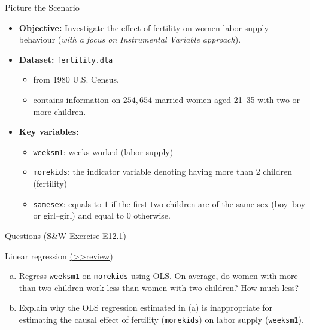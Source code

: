 \documentclass[
  10pt,
  ignorenonframetext,
]{beamer}
\providecommand{\tightlist}{%
  \setlength{\itemsep}{0pt}\setlength{\parskip}{0pt}}
\begin{document}
\begin{frame}[fragile]{Picture the Scenario}
\protect\hypertarget{picture-the-scenario}{}
\begin{itemize}
\tightlist
\item
  \textbf{Objective:} Investigate the effect of fertility on women labor
  supply behaviour (\emph{with a focus on Instrumental Variable
  approach}).
\end{itemize}

\vspace{0.8mm}

\begin{itemize}
\tightlist
\item
  \textbf{Dataset:} \texttt{fertility.dta}

  \begin{itemize}
  \tightlist
  \item
    from 1980 U.S. Census.
  \item
    contains information on \(254,654\) married women aged 21--35 with
    two or more children.
  \end{itemize}
\end{itemize}

\vspace{0.8mm}

\begin{itemize}
\tightlist
\item
  \textbf{Key variables:}

  \begin{itemize}
  \tightlist
  \item
    \texttt{weeksm1}: weeks worked (labor supply)
  \item
    \texttt{morekids}: the indicator variable denoting having more than
    2 children (fertility)
  \item
    \texttt{samesex}: equals to \(1\) if the first two children are of
    the same sex (boy--boy or girl--girl) and equal to \(0\) otherwise.
  \end{itemize}
\end{itemize}
\end{frame}

\begin{frame}[fragile]{Questions (S\&W Exercise E12.1)}
\protect\hypertarget{LGQ}{}
\begin{block}{Linear regression}
\protect\hypertarget{linear-regression}{}
\footnotesize \protect\hyperlink{LGCG}{(\textgreater\textgreater review)}
\normalsize

\begin{enumerate}
[(a)]
\item
  Regress \texttt{weeksm1} on \texttt{morekids} using OLS. On average,
  do women with more than two children work less than women with two
  children? How much less?
\item
  Explain why the OLS regression estimated in (a) is inappropriate for
  estimating the causal effect of fertility (\texttt{morekids}) on labor
  supply (\texttt{weeksm1}).
\end{enumerate}
\end{block}
\end{frame}
\end{document}
